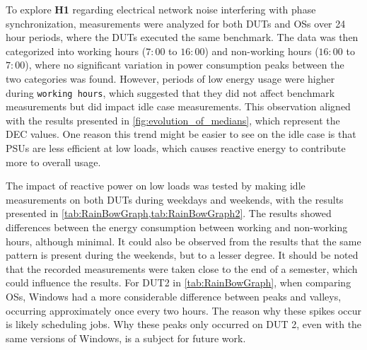 
To explore \textbf{H1} regarding electrical network noise interfering with phase synchronization, measurements were analyzed for both DUTs and OSs over 24 hour periods, where the DUTs executed the same benchmark. The data was then categorized into working hours ($7:00$ to $16:00$) and non-working hours ($16:00$ to $7:00$), where no significant variation in power consumption peaks between the two categories was found. However, periods of low energy usage were higher during \texttt{working hours}, which suggested that they did not affect benchmark measurements but did impact idle case measurements. This observation aligned with the results presented in \cref{fig:evolution_of_medians}, which represent the DEC values. One reason this trend might be easier to see on the idle case is that PSUs are less efficient at low loads, which causes reactive energy to contribute more to overall usage.\cite{PowerSupply} 



The impact of reactive power on low loads was tested by making idle measurements on both DUTs during weekdays and weekends, with the results presented in  \cref{tab:RainBowGraph,tab:RainBowGraph2}. The results showed differences between the energy consumption between working and non-working hours, although minimal. It could also be observed from the results that the same pattern is present during the weekends, but to a lesser degree. It should be noted that the recorded measurements were taken close to the end of a semester, which could influence the results. For DUT2 in \cref{tab:RainBowGraph}, when comparing OSs, Windows had a more considerable difference between peaks and valleys, occurring approximately once every two hours. The reason why these spikes occur is likely scheduling jobs.%
Why these peaks only occurred on DUT 2, even with the same versions of Windows, is a subject for future work. 

